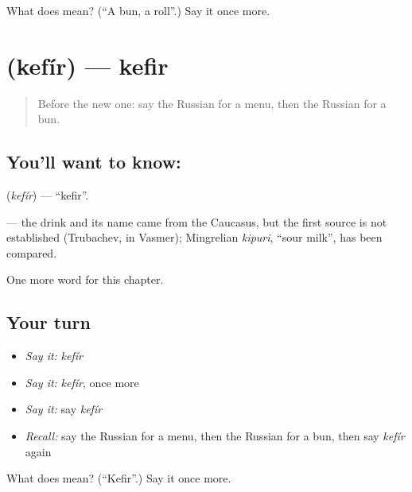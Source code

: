 \begin{tcolorbox}[breakable,colback=teal!4,colframe=teal!35!black,title={Before you move on}]
What does  mean? (\textquotedblleft{}A bun, a roll\textquotedblright{}.) Say it once more.
\end{tcolorbox}
\section[\texorpdfstring{\ru{кефир} (kefír)}{кефир (kefír)}]{ (kefír) — kefir}

\label{lesson:RU-C222-kefir}



\begin{quote}
Before the new one: say the Russian for a menu, then the Russian for a bun.
\end{quote}

\subsection*{You'll want to know: }
\textbf{} (\emph{kefír}) — \textquotedblleft{}kefir\textquotedblright{}.

\begin{cousinweb}
\textbf{} — the drink and its name came from the Caucasus, but the first source is not established (Trubachev, in Vasmer); Mingrelian \emph{kipuri}, \textquotedblleft{}sour milk\textquotedblright{}, has been compared.
\end{cousinweb}

\begin{grammarlens}[title={What you've built}]
One more word for this chapter.
\end{grammarlens}

\subsection*{Your turn}
\begin{itemize}
\raggedright
  \item \emph{Say it:} \emph{kefír}
  \item \emph{Say it:} \emph{kefír}, once more
  \item \emph{Say it:} say \emph{kefír}
  \item \emph{Recall:} say the Russian for a menu, then the Russian for a bun, then say \emph{kefír} again
\end{itemize}

\begin{tcolorbox}[breakable,colback=teal!4,colframe=teal!35!black,title={Before you move on}]
What does  mean? (\textquotedblleft{}Kefir\textquotedblright{}.) Say it once more.
\end{tcolorbox}
